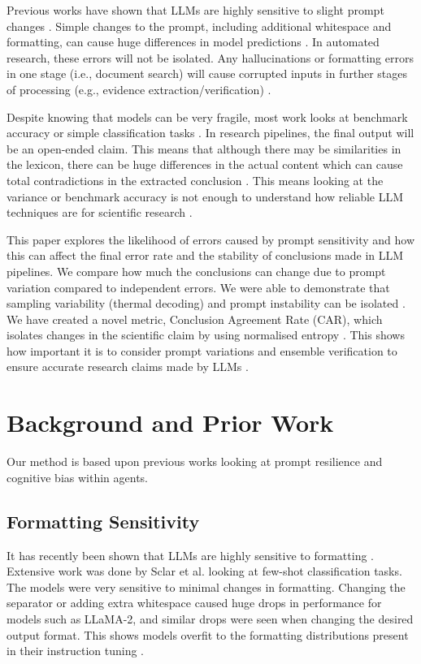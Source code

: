 \documentclass[10pt, conference, letterpaper]{IEEEtran}
\begin{document}
Previous works have shown that LLMs are highly sensitive to slight prompt changes \cite{sclar2024quantifying, salinas2024}. Simple changes to the prompt, including additional whitespace and formatting, can cause huge differences in model predictions \cite{lu2022fantastically}. In automated research, these errors will not be isolated. Any hallucinations or formatting errors in one stage (i.e., document search) will cause corrupted inputs in further stages of processing (e.g., evidence extraction/verification) \cite{mialon2023augmented, wu2023agentbench}.

Despite knowing that models can be very fragile, most work looks at benchmark accuracy or simple classification tasks \cite{brown2020language, touvron2023llama}. In research pipelines, the final output will be an open-ended claim. This means that although there may be similarities in the lexicon, there can be huge differences in the actual content which can cause total contradictions in the extracted conclusion \cite{elazar2021measuring}. This means looking at the variance or benchmark accuracy is not enough to understand how reliable LLM techniques are for scientific research \cite{turpin2023language}.

This paper explores the likelihood of errors caused by prompt sensitivity and how this can affect the final error rate and the stability of conclusions made in LLM pipelines. We compare how much the conclusions can change due to prompt variation compared to independent errors. We were able to demonstrate that sampling variability (thermal decoding) and prompt instability can be isolated \cite{wang2023self}. We have created a novel metric, Conclusion Agreement Rate (CAR), which isolates changes in the scientific claim by using normalised entropy \cite{errica2025wrong}. This shows how important it is to consider prompt variations and ensemble verification to ensure accurate research claims made by LLMs \cite{zhao2021calibrate}.

\section{Background and Prior Work}
Our method is based upon previous works looking at prompt resilience and cognitive bias within agents.

\subsection{Formatting Sensitivity}
It has recently been shown that LLMs are highly sensitive to formatting \cite{sclar2024quantifying, salinas2024}. Extensive work was done by Sclar et al. \cite{sclar2024quantifying} looking at few-shot classification tasks. The models were very sensitive to minimal changes in formatting. Changing the separator or adding extra whitespace caused huge drops in performance for models such as LLaMA-2, and similar drops were seen when changing the desired output format. This shows models overfit to the formatting distributions present in their instruction tuning \cite{ouyang2022training, huang2023towards}.
\end{document}
